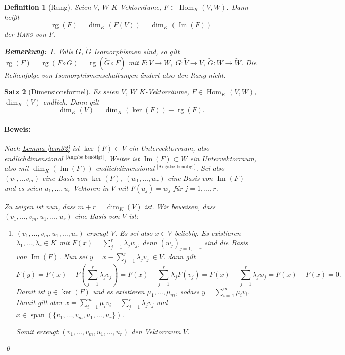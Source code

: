 \documentclass{report}
\newcommand{\IN}[1]{\index{#1|BH}}
\newcommand{\lb}{\lambda}
\DeclareMathOperator{\Span}{span}
\DeclareMathOperator{\Hom}{Hom}
\DeclareMathOperator{\Ima}{Im}
\DeclareMathOperator{\rg}{rg}
\theoremstyle{customrem}
\newtheorem*{bemerkung}{Bemerkung\textnormal:}
\theoremstyle{customdef}
\newtheorem{definition}{Definition}[chapter]
\newtheorem{satz}[definition]{Satz}
\renewenvironment{proof}{\paragraph{Beweis: }}{\qed}
\theoremstyle{customenv}
\newcommand{\defemph}[1]{\textsc{#1}}
\begin{document}
	\begin{definition}[Rang]
		\IN{Rang}
		Seien \(V\), \(W\) \(K\)-Vektorräume, \(F\in\Hom_K(V, W)\). Dann heißt \[\rg(F)=\dim_K(F(V)) = \dim_K(\Ima(F))\] der \defemph{Rang} von \(F\).\\
		\begin{bemerkung}
			Falls \(G\), \(\widetilde{G}\) Isomorphismen sind, so gilt \(\rg(F) = \rg(F\circ G) = \rg(\widetilde{G}\circ F)\) mit \(F:V\to W,\ G:\widetilde{V}\to V,\ \widetilde{G}: W\to\widetilde{W}\). Die Reihenfolge von Isomorphismenschaltungen ändert also den Rang nicht.\\
		\end{bemerkung}
	\end{definition}
	\pagebreak[2]
	\begin{satz}[Dimensionsformel]
		\IN{Dimensionsformel}
		\label{satz37}
		Es seien \(V\), \(W\) \(K\)-Vektorräume, \(F\in\Hom_K(V, W)\), \(\dim_K(V)\) endlich. Dann gilt \[\dim_K(V) = \dim_K(\ker(F))+\rg(F).\]
		\begin{proof}
			Nach \hyperref[lem32]{Lemma \ref*{lem32}} ist \(\ker(F)\subset V\) ein Untervektorraum, also endlichdimensional \({}^\text{[Angabe benötigt]}\). Weiter ist \(\Ima(F)\subset W\) ein Untervektorraum, also mit \(\dim_K(\Ima(F))\) endlichdimensional \({}^\text{[Angabe benötigt]}\). Sei also \((v_1, \ldots v_m)\) eine Basis von \(\ker(F)\), \((w_1,\ldots, w_r)\) eine Basis von \(\Ima(F)\) und es seien \(u_1,\ldots, u_r\) Vektoren in \(V\) mit \(F(u_j)=w_j\) für \(j=1, \ldots, r\).

			Zu zeigen ist nun, dass \(m+r=\dim_K(V)\) ist. Wir beweisen, dass \((v_1, \ldots, v_m, u_1, \ldots, u_r)\) eine Basis von \(V\) ist:
			\begin{enumerate}
				\item \((v_1, \ldots, v_m, u_1, \ldots, u_r)\) erzeugt \(V\). Es sei also \(x\in V\) beliebig. Es existieren \(\lb_1, \ldots, \lb_r\in K\) mit \(F(x) = \sum_{j=1}^{r}\lb_j w_j\), denn \((w_j)_{j=1, \ldots, r}\) sind die Basis von \(\Ima(F)\). Nun sei \(y=x-\sum_{j=1}^{r}\lb_j v_j\ \in V\). dann gilt \[F(y) = F(x) - F\left(\sum_{j=1}^{r}\lb_j v_j\right) = F(x) - \sum_{j=1}^{r}\lb_j F(v_j)= F(x) - \sum_{j=1}^{r}\lb_j w_j = F(x)-F(x)=0.\] Damit ist \(y\in \ker(F)\) und es existieren \(\mu_1, \ldots, \mu_m\), sodass \(y=\sum_{i=1}^{m}\mu_i v_i\). Damit gilt aber \(x=\sum_{i=1}^{m}\mu_iv_i + \sum_{j=1}^{r}\lb_jv_j\) und \(x\in \Span(\{v_1, \ldots, v_m, u_1, \ldots, u_r\})\).

				Somit erzeugt \((v_1, \ldots, v_m, u_1, \ldots, u_r)\) den Vektorraum \(V\).


\end{enumerate}
\end{proof}
\end{satz}
\end{document}
